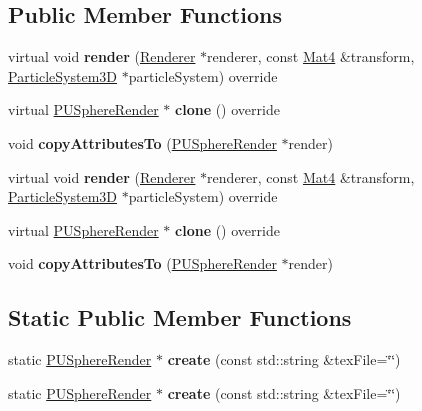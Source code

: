 \subsection*{Public Member Functions}
\begin{DoxyCompactItemize}
\item 
\mbox{\label{classPUSphereRender_a1030e66ca6f833473c6b3f3682bcea67}} 
virtual void {\bfseries render} (\hyperlink{classRenderer}{Renderer} $\ast$renderer, const \hyperlink{classMat4}{Mat4} \&transform, \hyperlink{classParticleSystem3D}{Particle\+System3D} $\ast$particle\+System) override
\item 
\mbox{\label{classPUSphereRender_a2bae6d85c4a39732ba21e1dfff06e5af}} 
virtual \hyperlink{classPUSphereRender}{P\+U\+Sphere\+Render} $\ast$ {\bfseries clone} () override
\item 
\mbox{\label{classPUSphereRender_a23ebd4c1e87d60f688a64c131391dd6a}} 
void {\bfseries copy\+Attributes\+To} (\hyperlink{classPUSphereRender}{P\+U\+Sphere\+Render} $\ast$render)
\item 
\mbox{\label{classPUSphereRender_a365b51e8060bcf76562b5fe08ecb5636}} 
virtual void {\bfseries render} (\hyperlink{classRenderer}{Renderer} $\ast$renderer, const \hyperlink{classMat4}{Mat4} \&transform, \hyperlink{classParticleSystem3D}{Particle\+System3D} $\ast$particle\+System) override
\item 
\mbox{\label{classPUSphereRender_ad5f3f9b56a20f95638c4b6ef89a869c5}} 
virtual \hyperlink{classPUSphereRender}{P\+U\+Sphere\+Render} $\ast$ {\bfseries clone} () override
\item 
\mbox{\label{classPUSphereRender_a23ebd4c1e87d60f688a64c131391dd6a}} 
void {\bfseries copy\+Attributes\+To} (\hyperlink{classPUSphereRender}{P\+U\+Sphere\+Render} $\ast$render)
\end{DoxyCompactItemize}
\subsection*{Static Public Member Functions}
\begin{DoxyCompactItemize}
\item 
\mbox{\label{classPUSphereRender_a6217ae630d7c0dac1fa21c9595aca555}} 
static \hyperlink{classPUSphereRender}{P\+U\+Sphere\+Render} $\ast$ {\bfseries create} (const std\+::string \&tex\+File=\char`\"{}\char`\"{})
\item 
\mbox{\label{classPUSphereRender_a9db3d3bc639fa28e050c8aedaa3b21a7}} 
static \hyperlink{classPUSphereRender}{P\+U\+Sphere\+Render} $\ast$ {\bfseries create} (const std\+::string \&tex\+File=\char`\"{}\char`\"{})
\end{DoxyCompactItemize}
